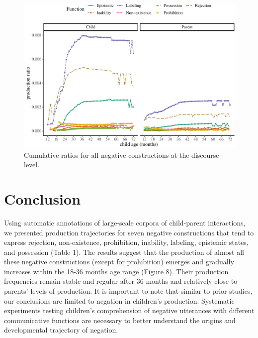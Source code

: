 \documentclass[
  english,
  man,floatsintext]{apa6}
\begin{document}
\begin{figure}[H]

{\centering \includegraphics{neg_construction_article_files/figure-latex/alldiscourse-1} 

}

\caption{Cumulative ratios for all negative constructions at the discourse level.}\label{fig:alldiscourse}
\end{figure}

\hypertarget{conclusion}{%
\section{Conclusion}\label{conclusion}}

Using automatic annotations of large-scale corpora of child-parent interactions, we presented production trajectories for seven negative constructions that tend to express rejection, non-existence, prohibition, inability, labeling, epistemic states, and possession (Table 1). The results suggest that the production of almost all these negative constructions (except for prohibition) emerges and gradually increases within the 18-36 months age range (Figure 8). Their production frequencies remain stable and regular after 36 months and relatively close to parents' levels of production. It is important to note that similar to prior studies, our conclusions are limited to negation in children's production. Systematic experiments testing children's comprehension of negative utterances with different communicative functions are necessary to better understand the origins and developmental trajectory of negation.
\end{document}
